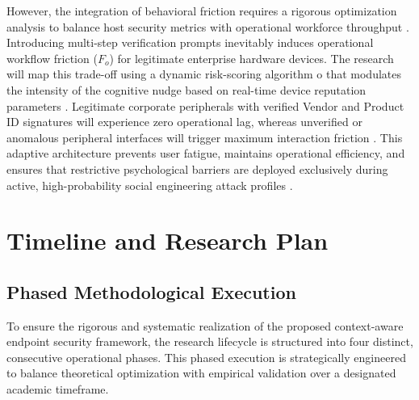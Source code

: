 \documentclass{ieeeaccess}
\begin{document}
However, the integration of behavioral friction requires a rigorous optimization analysis to balance host security metrics with operational workforce throughput \cite{ref27}. Introducing multi-step verification prompts inevitably induces operational workflow friction ($F_o$) for legitimate enterprise hardware devices. The research will map this trade-off using a dynamic risk-scoring algorithm o that modulates the intensity of the cognitive nudge based on real-time device reputation parameters \cite{ref28}. Legitimate corporate peripherals with verified Vendor and Product ID signatures will experience zero operational lag, whereas unverified or anomalous peripheral interfaces will trigger maximum interaction friction \cite{ref29}. This adaptive architecture prevents user fatigue, maintains operational efficiency, and ensures that restrictive psychological barriers are deployed exclusively during active, high-probability social engineering attack profiles \cite{ref30}.



 \section{Timeline and Research Plan}
\label{sec:timeline}

\subsection{Phased Methodological Execution}
To ensure the rigorous and systematic realization of the proposed context-aware endpoint security framework, the research lifecycle is structured into four distinct, consecutive operational phases. This phased execution is strategically engineered to balance theoretical optimization with empirical validation over a designated academic timeframe.
\end{document}
